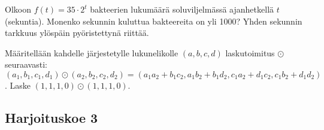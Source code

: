 	\begin{tehtava}
Olkoon $f(t) = 35 \cdot 2^t$ bakteerien lukumäärä soluviljelmässä ajanhetkellä $t$ (sekuntia). Monenko sekunnin kuluttua bakteereita on yli 1000? Yhden sekunnin tarkkuus ylöspäin pyöristettynä riittää.
	\end{tehtava}
	\begin{tehtava}
Määritellään kahdelle järjestetylle lukunelikolle $(a, b, c, d)$ laskutoimitus $\odot$ seuraavasti: $(a_1, b_1, c_1, d_1) \odot (a_2, b_2, c_2, d_2) = (a_1 a_2 + b_1 c_2, a_1 b_2 + b_1 d_2, c_1 a_2 + d_1 c_2, c_1 b_2 + d_1 d_2)$. Laske $(1, 1, 1, 0) \odot (1, 1, 1, 0)$.
\end{tehtava}

\subsection*{Harjoituskoe 3}


